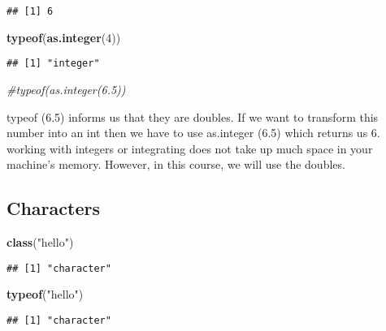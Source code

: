 \documentclass[
]{article}
\newenvironment{Shaded}{\begin{snugshade}}{\end{snugshade}}
\newcommand{\CommentTok}[1]{\textcolor[rgb]{0.56,0.35,0.01}{\textit{#1}}}
\newcommand{\DecValTok}[1]{\textcolor[rgb]{0.00,0.00,0.81}{#1}}
\newcommand{\FunctionTok}[1]{\textcolor[rgb]{0.13,0.29,0.53}{\textbf{#1}}}
\newcommand{\NormalTok}[1]{#1}
\newcommand{\StringTok}[1]{\textcolor[rgb]{0.31,0.60,0.02}{#1}}
\begin{document}
\begin{verbatim}
## [1] 6
\end{verbatim}

\begin{Shaded}
\begin{Highlighting}[]
\FunctionTok{typeof}\NormalTok{(}\FunctionTok{as.integer}\NormalTok{(}\DecValTok{4}\NormalTok{))}
\end{Highlighting}
\end{Shaded}

\begin{verbatim}
## [1] "integer"
\end{verbatim}

\begin{Shaded}
\begin{Highlighting}[]
\CommentTok{\#typeof(as.integer(6.5))}
\end{Highlighting}
\end{Shaded}

typeof (6.5) informs us that they are doubles. If we want to transform
this number into an int then we have to use as.integer (6.5) which
returns us 6. working with integers or integrating does not take up much
space in your machine's memory. However, in this course, we will use the
doubles.

\hypertarget{characters}{%
\subsection{Characters}\label{characters}}

\begin{Shaded}
\begin{Highlighting}[]
\FunctionTok{class}\NormalTok{(}\StringTok{"hello"}\NormalTok{)}
\end{Highlighting}
\end{Shaded}

\begin{verbatim}
## [1] "character"
\end{verbatim}

\begin{Shaded}
\begin{Highlighting}[]
\FunctionTok{typeof}\NormalTok{(}\StringTok{"hello"}\NormalTok{)}
\end{Highlighting}
\end{Shaded}

\begin{verbatim}
## [1] "character"
\end{verbatim}
\end{document}
